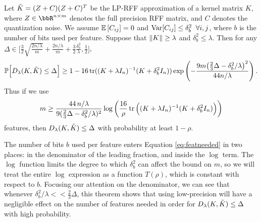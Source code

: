 \begin{theorem}
	\label{thm2}
	Let $\tilde{K} = (Z+C)(Z+C)^T$ be the LP-RFF approximation of a kernel matrix $K$, where $Z\in\RR^{n\times m}$ denotes the full precision RFF matrix, and $C$ denotes the quantization noise.  We assume $\expect{}{C_{ij}} = 0$ and ${\rm Var}[C_{ij}] \leq \delta_b^2 \;\;\forall i,j$, where $b$ is the number of bits used per feature. Suppose that $\|K\| \geq \lambda$ and $\delta^2_b \leq \lambda$. Then for any $\Delta \in \Big[\frac{3}{2}\sqrt{\frac{2n/\lambda}{m}} + \frac{2n/\lambda}{m} + \frac{3}{2}\frac{\delta^2_b}{\lambda}, \frac{1}{2} \Big]$,
	\begin{equation*}
	\mathbb{P}\Big[D_{\lambda}(K,\tilde{K}) \leq \Delta\Big] \geq 1 - 16 \mathop{\rm tr}((K + \lambda I_n)^{-1} (K + \delta^2_b I_n)) \exp \left( -\frac{9m \big(\frac{2}{3}\Delta - \delta^2_b / \lambda\big)^2}{44n/\lambda} \right).
	\end{equation*}
	Thus if we use 
	\begin{equation}
	\label{eq:featneeded}
	m \geq \frac{44\, n/\lambda}{9(\frac{2}{3}\Delta - \delta_b^2/\lambda)^{2}} \log \bigg(\frac{16}{\rho} \mathop{\rm tr}\Big((K + \lambda I_n)^{-1} (K + \delta^2_b I_n)\Big) \bigg)
	\end{equation}
	features, then $D_\lambda(K,\tilde{K})\leq \Delta$  with probability at least $1 - \rho$.
\end{theorem}

The number of bits $b$ used per feature enters Equation \ref{eq:featneeded} in two places: in the denominator of the leading fraction, and inside the $\log$ term. The $\log$ function limits the degree to which $\delta_b^2$ can affect the bound on $m$, so we will treat the entire $\log$ expression as a function $T(\rho)$, which is constant with respect to $b$. Focusing our attention on the denominator, we can see that whenever $\delta_b^2/\lambda << \frac{2}{3}\Delta$, this theorem shows that using low-precision will have a negligible effect on the number of features needed in order for $D_{\lambda}(K,\tilde{K}) \leq \Delta$ with high probability. 

